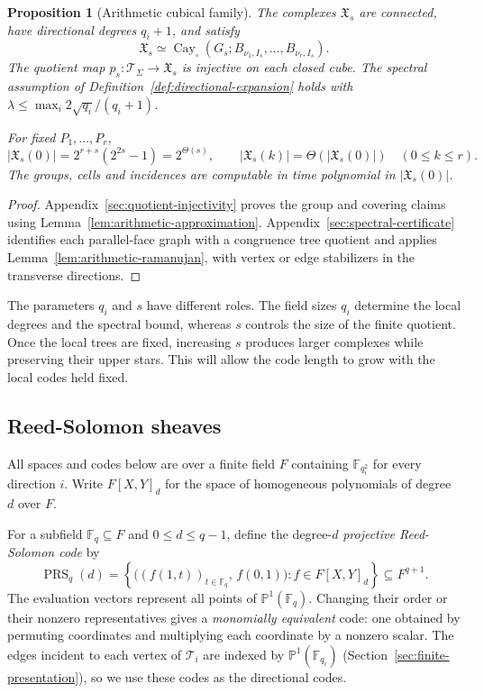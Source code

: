 \documentclass[11pt,letterpaper]{article}
\renewcommand{\le}{\leqslant}
\newtheorem{proposition}[theorem]{Proposition}
\theoremstyle{definition}
\theoremstyle{remark}
\newcommand{\F}{\mathbb F}
\newcommand{\PP}{\mathbb P}
\newcommand{\X}{\mathfrak{X}}
\begin{document}
\begin{proposition}[Arithmetic cubical family]
\label{prop:cubical-input}\label{prop:face-spectrum}
The complexes $\X_s$ are connected, have directional degrees
$q_i+1$, and satisfy
\begin{equation}
 \X_s\simeq\operatorname{Cay}_\square
 (G_s;B_{\nu_1,I_s},\ldots,B_{\nu_r,I_s}).
 \label{eq:finite-cell-definition}
\end{equation}
The quotient map $p_s:\mathcal T_\Sigma\to\X_s$
is injective on each closed cube.
The spectral assumption of Definition~\ref{def:directional-expansion}
holds with
$\lambda\le\max_i 2\sqrt{q_i}/(q_i+1)$.

For fixed $P_1,\ldots,P_r$,
\begin{equation}
 |\X_s(0)|=2^{r+s}(2^{2s}-1)=2^{\Theta(s)},\qquad
 |\X_s(k)|=\Theta(|\X_s(0)|)\quad(0\le k\le r).
 \label{eq:quotient-size}
\end{equation}
The groups, cells and incidences are computable in time polynomial
in $|\X_s(0)|$.
\end{proposition}
\begin{proof}
Appendix~\ref{sec:quotient-injectivity} proves the group and
covering claims using Lemma~\ref{lem:arithmetic-approximation}.
Appendix~\ref{sec:spectral-certificate} identifies each parallel-face
graph with a congruence tree quotient and applies
Lemma~\ref{lem:arithmetic-ramanujan}, with vertex or edge stabilizers
in the transverse directions.
\end{proof}

The parameters $q_i$ and $s$ have different roles.
The field sizes $q_i$ determine the local degrees and
the spectral bound, whereas $s$ controls the size of
the finite quotient. Once the local trees are fixed,
increasing $s$ produces larger complexes while preserving
their upper stars. This will allow the code length to grow
with the local codes held fixed.

\subsection{Reed-Solomon sheaves}
\label{sec:directional-codes}\label{sec:edge-matching}
\label{sec:rs-compatibility}\label{sec:rs-descent}
All spaces and codes below are over a finite field $F$ containing
$\F_{q_i^2}$ for every direction $i$.
Write $F[X,Y]_d$ for the space of homogeneous polynomials
of degree $d$ over $F$.

For a subfield $\F_q\subseteq F$ and $0\le d\le q-1$, define the
degree-$d$ \emph{projective Reed-Solomon code} by
\[
 \operatorname{PRS}_q(d)=
 \left\{\bigl((f(1,t))_{t\in\F_q},\,f(0,1)\bigr):
              f\in F[X,Y]_d\right\}\subseteq F^{q+1}.
\]
The evaluation vectors represent all points of $\PP^1(\F_q)$.
Changing their order or their nonzero representatives gives a
\emph{monomially equivalent} code: one obtained by permuting coordinates
and multiplying each coordinate by a nonzero scalar.
The edges incident to each vertex of $\mathcal T_i$ are indexed by
$\PP^1(\F_{q_i})$ (Section~\ref{sec:finite-presentation}), so we use
these codes as the directional codes.
\end{document}
